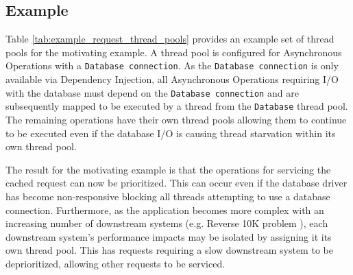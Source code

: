 \documentclass[prodmode]{style/acmlarge}
\begin{document}
\subsection{Example}

Table \ref{tab:example_request_thread_pools} provides an example set of thread
pools for the motivating example.  A thread pool is configured for Asynchronous
Operations with a \texttt{Database connection}.  As the \texttt{Database
connection} is only available via Dependency Injection, all Asynchronous
Operations requiring I/O with the database must depend on the \texttt{Database
connection} and are subsequently mapped to be executed by a thread from the
\texttt{Database} thread pool.  The remaining operations have their own thread
pools allowing them to continue to be executed even if the database I/O is
causing thread starvation within its own thread pool.

\begin{table}[t]
\label{tab:example_request_thread_pools}
\end{table}

The result for the motivating example is that the operations for servicing the
cached request can now be prioritized.  This can occur even if the database
driver has become non-responsive blocking all threads attempting to use a
database connection.  Furthermore, as the application becomes more complex with
an increasing number of downstream systems (e.g. Reverse 10K problem
\cite{reverse-ten-k-problem}), each downstream system's performance impacts may
be isolated by assigning it its own thread pool.  This has requests requiring a
slow downstream system to be deprioritized, allowing other requests to be
serviced.
\end{document}
